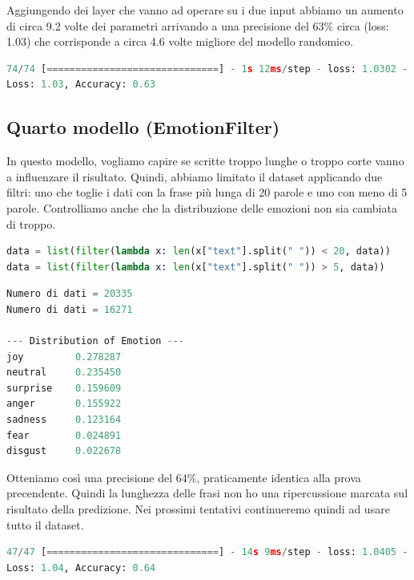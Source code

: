 \documentclass{article}
\begin{document}
Aggiungendo dei layer che vanno ad operare su i due input abbiamo un aumento di circa 9.2 volte dei parametri arrivando a una precisione del 63\% circa (loss: 1.03) che corrisponde a circa 4.6 volte migliore del modello randomico.

\begin{lstlisting}[language=Python, caption=Risultati terzo modello]
74/74 [==============================] - 1s 12ms/step - loss: 1.0302 - accuracy: 0.6329
Loss: 1.03, Accuracy: 0.63
\end{lstlisting}


\subsection{Quarto modello (EmotionFilter)}
In questo modello, vogliamo capire se scritte troppo lunghe o troppo corte vanno a influenzare il risultato. Quindi, abbiamo limitato il dataset applicando due filtri: uno che toglie i dati con la frase più lunga di 20 parole e uno con meno di 5 parole. Controlliamo anche che la distribuzione delle emozioni non sia cambiata di troppo.
\begin{lstlisting}[language=Python, caption=Riduzione parametri tramite filtri]
data = list(filter(lambda x: len(x["text"].split(" ")) < 20, data))
data = list(filter(lambda x: len(x["text"].split(" ")) > 5, data))
\end{lstlisting}

\bigskip

\begin{lstlisting}[language=Python, caption=Distribuzione emozioni]
Numero di dati = 20335
Numero di dati = 16271

--- Distribution of Emotion ---
joy         0.278287
neutral     0.235450
surprise    0.159609
anger       0.155922
sadness     0.123164
fear        0.024891
disgust     0.022678
\end{lstlisting}

Otteniamo così una precisione del $64\%$, praticamente identica alla prova precendente. Quindi la lunghezza delle frasi non ho una ripercussione marcata sul risultato della predizione. Nei prossimi tentativi continueremo quindi ad usare tutto il dataset.
\begin{lstlisting}[language=Python, caption=Risultati quarto modello]
47/47 [==============================] - 14s 9ms/step - loss: 1.0405 - accuracy: 0.6418
Loss: 1.04, Accuracy: 0.64
\end{lstlisting}
\end{document}
